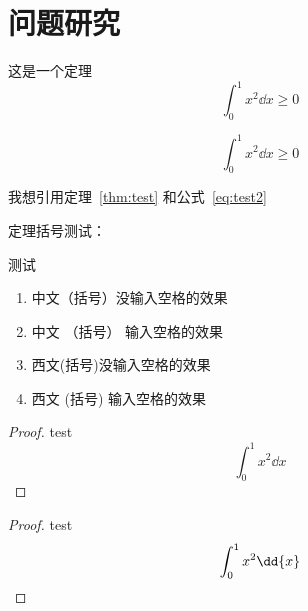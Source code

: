 \chapter{问题研究}

\begin{theorem}[Cauchy]\label{thm:test}
  这是一个定理
  \begin{equation}\label{eq:test1}
    \int_{0}^{1} x^2 \dd{x} \geq 0
  \end{equation}

  \begin{equation}\label{eq:test2}
    \int_{0}^{1} x^2 \dd{x} \geq 0
  \end{equation}
\end{theorem}

我想引用定理~\ref{thm:test} 和公式~\ref{eq:test2}


定理括号测试：

\begin{theorem}
  测试
  \begin{enumerate}
    \item 中文（括号）没输入空格的效果
    \item 中文 （括号） 输入空格的效果
    \item 西文(括号)没输入空格的效果
    \item 西文 (括号) 输入空格的效果
  \end{enumerate}
\end{theorem} 


\begin{proof}
  test
  \[
    \int_{0}^{1} x^2 \dd{x}
  \]
\end{proof}

\begin{proof}
  test
  \[
    \int_{0}^{1} x^2 \dd{x}  \qedhere
  \]
\end{proof}